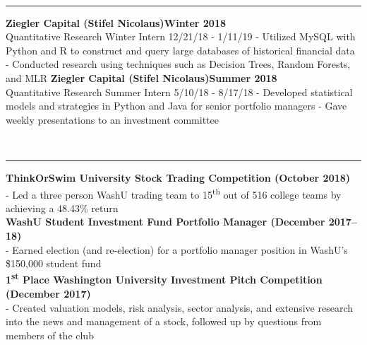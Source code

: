 \documentclass[12pt]{article}
\begin{document}
\begin{titlepage}
\begin{addmargin}[1em]{0em}
\begin{center}
\begin{minipage}[b]{0.3\textwidth}
				\end{minipage}
			\end{center}
		\end{addmargin}
		\vspace{-10pt}
		\noindent
		\\\rule{\textwidth}{0.4pt}
		\begin{addmargin}[1em]{0em}
			\textbf{Ziegler Capital (Stifel Nicolaus)\hfill Winter 2018}\\
Quantitative Research Winter Intern \hfill {\small{12/21/18 - 1/11/19}}\newline
- Utilized MySQL with Python and R to construct and query large databases of historical financial data \newline
- Conducted research using techniques such as Decision Trees, Random Forests, and MLR\newline
			\textbf{Ziegler Capital (Stifel Nicolaus)\hfill Summer 2018}\\
Quantitative Research Summer Intern \hfill {\small{5/10/18 - 8/17/18}}\newline
- Developed statistical models and strategies in Python and Java for senior portfolio managers\newline
- Gave weekly presentations to an investment committee\newline
		\end{addmargin}
		\vspace{-10pt}
		\noindent
		\\\rule{\textwidth}{0.4pt}
		\begin{addmargin}[1em]{0em}
			\textbf{ThinkOrSwim University Stock Trading Competition \hfill (October 2018)}\\
- Led a three person WashU trading team to 15\textsuperscript{th} out of 516 college teams by achieving a 48.43\% return\\
			\textbf{WashU Student Investment Fund Portfolio Manager \hfill (December 2017–18)}\\
- Earned election (and re-election) for a portfolio manager position in WashU's \$150,000 student fund\\
			\textbf{1\textsuperscript{st} Place Washington University Investment Pitch Competition \hfill (December 2017)}\\
- Created valuation models, risk analysis, sector analysis, and extensive research into the news and management of a stock, followed up by questions from members of the club\\

\end{addmargin}
\end{titlepage}
\end{document}
